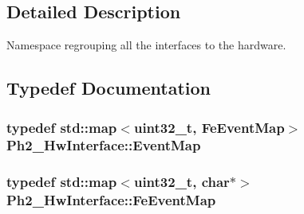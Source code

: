 \subsection{Detailed Description}
Namespace regrouping all the interfaces to the hardware. 

\subsection{Typedef Documentation}
\hypertarget{namespace_ph2___hw_interface_acf9f41d647e7a3ad9bae233b04b9e3bc}{
\subsubsection[{Event\-Map}]{\setlength{\rightskip}{0pt plus 5cm}typedef std\-::map$<$uint32\-\_\-t, {\bf Fe\-Event\-Map}$>$ {\bf Ph2\-\_\-\-Hw\-Interface\-::\-Event\-Map}}}\label{namespace_ph2___hw_interface_acf9f41d647e7a3ad9bae233b04b9e3bc}
\hypertarget{namespace_ph2___hw_interface_a50d97ee46941c2c0c2ecadc929e41b05}{
\subsubsection[{Fe\-Event\-Map}]{\setlength{\rightskip}{0pt plus 5cm}typedef std\-::map$<$uint32\-\_\-t, char$\ast$$>$ {\bf Ph2\-\_\-\-Hw\-Interface\-::\-Fe\-Event\-Map}}}\label{namespace_ph2___hw_interface_a50d97ee46941c2c0c2ecadc929e41b05}


